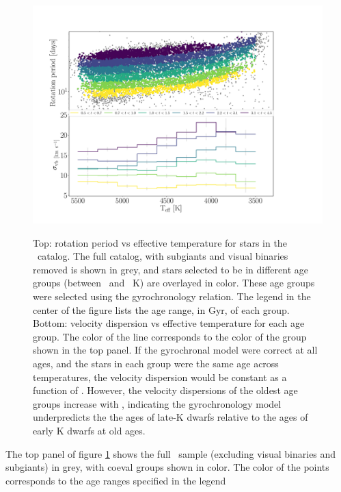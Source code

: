 \begin{figure}
  \caption{
Top: rotation period vs effective temperature for stars in the \mct\
    catalog.
    The full catalog, with subgiants and visual binaries removed is shown in
    grey, and stars selected to be in different age groups (between \tmin\ and
    \tmax\ K) are overlayed in color.
These age groups were selected using the \citet{angus2019} gyrochronology
    relation.
The legend in the center of the figure lists the age range, in Gyr, of each
    group.
Bottom: velocity dispersion vs effective temperature for each age
    group.
The color of the line corresponds to the color of the group shown in the top
    panel.
If the gyrochronal model were correct at all ages, and the stars in each group
    were the same age across temperatures, the velocity dispersion would be
    constant as a function of \teff.
However, the velocity dispersions of the oldest age groups increase with
    \teff, indicating the \citet{angus2019} gyrochronology model underpredicts
    the the ages of late-K dwarfs relative to the ages of early K dwarfs at
    old ages.
}
  \centering
    \includegraphics[width=1\textwidth]{age_cut}
\label{fig:age_cut}
\end{figure}
The top panel of figure \ref{fig:age_cut} shows the full \mct\ sample
(excluding visual binaries and subgiants) in grey, with coeval groups shown in
color.
The color of the points corresponds to the age ranges specified in the legend

